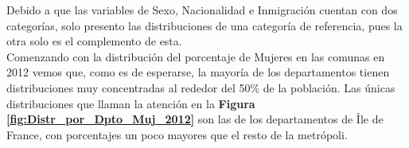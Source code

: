 \begin{table}[h]
\centering
{}
\caption{Variables censales del INSEE a utilizar en el análisis.}
\label{tbl:Variables_Censales}
\end{table}

 Debido a que las variables de Sexo, Nacionalidad e Inmigración cuentan con dos categorías, solo presento las distribuciones de una categoría de referencia, pues la otra solo es el complemento de esta.\\

Comenzando con la distribución del porcentaje de Mujeres en las comunas en 2012 vemos que, como es de esperarse, la mayoría de los departamentos tienen distribuciones muy concentradas al rededor del 50\% de la población. Las únicas distribuciones que llaman la atención en la \textbf{Figura \ref{fig:Distr_por_Dpto_Muj_2012}} son las de los departamentos de Île de France, con porcentajes un poco mayores que el resto de la metrópoli.\\ 

